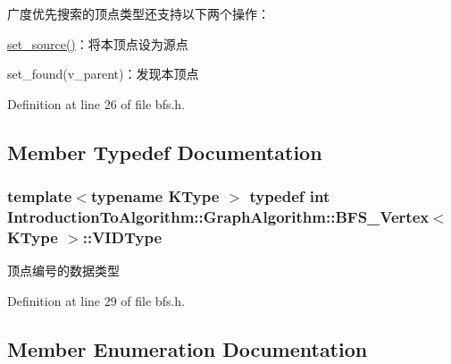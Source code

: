 广度优先搜索的顶点类型还支持以下两个操作：


\begin{DoxyItemize}
\item {\ttfamily \hyperlink{struct_introduction_to_algorithm_1_1_graph_algorithm_1_1_b_f_s___vertex_a3f5b9ba686fae02e01cd899261fe6793}{set\+\_\+source()}}：将本顶点设为源点
\item {\ttfamily set\+\_\+found(v\+\_\+parent)}：发现本顶点 
\end{DoxyItemize}

Definition at line 26 of file bfs.\+h.



\subsection{Member Typedef Documentation}
\hypertarget{struct_introduction_to_algorithm_1_1_graph_algorithm_1_1_b_f_s___vertex_a62cef758843cdaeefae2fc196f6bdb46}{}
\subsubsection[{V\+I\+D\+Type}]{\setlength{\rightskip}{0pt plus 5cm}template$<$typename K\+Type $>$ typedef int {\bf Introduction\+To\+Algorithm\+::\+Graph\+Algorithm\+::\+B\+F\+S\+\_\+\+Vertex}$<$ K\+Type $>$\+::{\bf V\+I\+D\+Type}}\label{struct_introduction_to_algorithm_1_1_graph_algorithm_1_1_b_f_s___vertex_a62cef758843cdaeefae2fc196f6bdb46}
顶点编号的数据类型 

Definition at line 29 of file bfs.\+h.



\subsection{Member Enumeration Documentation}
\hypertarget{struct_introduction_to_algorithm_1_1_graph_algorithm_1_1_b_f_s___vertex_a3f00f12565def71750f1f163e0e52305}{}

